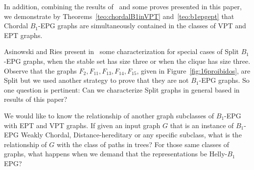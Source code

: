   In addition, combining the results of~\cite{alcon2014recognizing,Asinowski2009, golumbic2009} and some proves  presented in this paper, we demonstrate by  Theorems~\ref{teo:chordalB1inVPT} and~\ref{teo:b1epgept} that Chordal $B_1$-EPG graphs are simultaneously contained in the classes of VPT and EPT graphs.  
 
 

Asinowski and Ries present in~\cite{ries2009} some characterization for special cases of Split $B_1$-EPG graphs, when the stable set has size three or when the clique has size three. Observe that the graphs $F_2, F_{11}, F_{13}, F_{14}, F_{15}$, given in Figure~\ref{fig:16proibidos}, are Split but we used another strategy to prove that they are not $B_1$-EPG graphs. So one question is pertinent: Can we characterize Split graphs in general based in results of this paper? 

We would like to know the relationship of another graph subclasses of $B_1$-EPG with EPT and VPT graphs. If given an  input graph $G$ that is an instance of $B_1$-EPG  Weakly Chordal,  Distance-hereditary or any specific subclass, what is the relationship of $G$ with the class of paths in trees? For those same classes of graphs, what happens when we demand that the representations be Helly-$B_1$ EPG?

 
%




